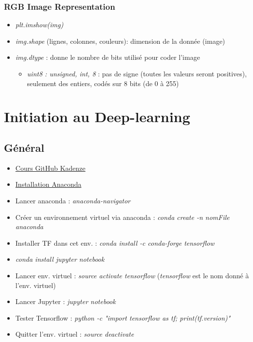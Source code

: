 \documentclass[12pt,a4paper]{article}
\begin{document}
\subsubsection{RGB Image Representation}
\begin{itemize}
\item \textit{plt.imshow(img)}
\item \textit{img.shape} (lignes, colonnes, couleurs): dimension de la donnée (image)
\item \textit{img.dtype} : donne le nombre de bits utilisé pour coder l'image
\begin{itemize}
\item \textit{uint8 : unsigned, int, 8} : pas de signe (toutes les valeurs seront positives), seulement des entiers, codés sur 8 bits (de 0 à 255)
\end{itemize}
\end{itemize}

\section{Initiation au Deep-learning}
\subsection{Général}
\begin{itemize}
\item \href{https://github.com/pkmital/CADL}{Cours GitHub Kadenze}
\item \href{http://docs.continuum.io/anaconda/install/linux/}{Installation Anaconda}
\item Lancer anaconda : \textit{anaconda-navigator}
\item Créer un environnement virtuel via anaconda : \textit{conda create -n nomFile anaconda}
\item Installer TF dans cet env. : \textit{conda install -c conda-forge tensorflow}
\item \textit{conda install jupyter notebook}
\item Lancer env. virtuel : \textit{source activate tensorflow} (\textit{tensorflow} est le nom donné à l'env. virtuel)
\item Lancer Jupyter : \textit{jupyter notebook}
\item Tester Tensorflow : \textit{python -c "import tensorflow as tf; print(tf.\textunderscore \textunderscore version\textunderscore \textunderscore)"}
\item Quitter l'env. virtuel : \textit{source deactivate}
\end{itemize}
\end{document}
